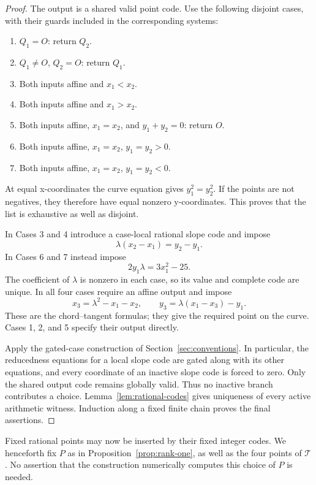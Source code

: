 \begin{proof}
The output is a shared valid point code.  Use the following disjoint
cases, with their guards included in the corresponding systems:
\begin{enumerate}
\item \(Q_1=O\): return \(Q_2\).
\item \(Q_1\ne O\), \(Q_2=O\): return \(Q_1\).
\item Both inputs affine and \(x_1<x_2\).
\item Both inputs affine and \(x_1>x_2\).
\item Both inputs affine, \(x_1=x_2\), and \(y_1+y_2=0\):
      return \(O\).
\item Both inputs affine, \(x_1=x_2\), \(y_1=y_2>0\).
\item Both inputs affine, \(x_1=x_2\), \(y_1=y_2<0\).
\end{enumerate}
At equal x-coordinates the curve equation gives
\(y_1^2=y_2^2\).  If the points are not negatives, they therefore
have equal nonzero y-coordinates.  This proves that the list is
exhaustive as well as disjoint.

In Cases 3 and 4 introduce a case-local rational slope code and impose
\[
 \lambda(x_2-x_1)=y_2-y_1.
\]
In Cases 6 and 7 instead impose
\[
 2y_1\lambda=3x_1^2-25.
\]
The coefficient of \(\lambda\) is nonzero in each case, so its
value and complete code are unique.  In all four cases require an
affine output and impose
\[
 x_3=\lambda^2-x_1-x_2,\qquad
 y_3=\lambda(x_1-x_3)-y_1.
\]
These are the chord--tangent formulas; they give the required point
on the curve.  Cases 1, 2, and 5 specify their output directly.

Apply the gated-case construction of Section~\ref{sec:conventions}.
In particular, the reducedness equations for a local slope code are
gated along with its other equations, and every coordinate of an
inactive slope code is forced to zero.  Only the shared output code
remains globally valid.  Thus no inactive branch contributes a
choice.  Lemma~\ref{lem:rational-codes} gives uniqueness of every
active arithmetic witness.  Induction along a fixed finite chain
proves the final assertions.
\end{proof}

Fixed rational points may now be inserted by their fixed integer
codes.  We henceforth fix \(P\) as in
Proposition~\ref{prop:rank-one}, as well as the four points of
\(\mathcal T\).  No assertion that the construction numerically
computes this choice of \(P\) is needed.

